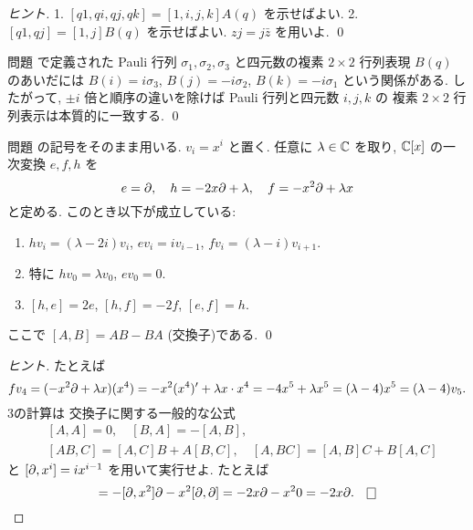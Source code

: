 \documentclass[12pt,twoside]{jarticle}
\begin{document}
\begin{proof}[ヒント]
  1. $[q1,qi,qj,qk]=[1,i,j,k]A(q)$ を示せばよい.
  2. $[q1,qj]=[1,j]B(q)$ を示せばよい. $zj=j\bar{z}$ を用いよ.
  \qed
\end{proof}

\begin{guide}
  問題  で定義された Pauli 行列 $\sigma_1,\sigma_2,\sigma_3$ 
  と四元数の複素 $2\times 2$ 行列表現 $B(q)$ のあいだには %
  $B(i)=i\sigma_3$, $B(j)=-i\sigma_2$, $B(k)=-i\sigma_1$ という関係がある.
  したがって, $\pm i$ 倍と順序の違いを除けば Pauli 行列と四元数 $i,j,k$ の
  複素 $2\times 2$ 行列表示は本質的に一致する.
  \qed
\end{guide}


\begin{question}[15点]
  \label{q:sl2-1}
  問題  の記号をそのまま用いる.
  $v_i = x^i$ と置く.
  任意に $\lambda\in{\mathbb C}$ を取り,
  ${\mathbb C}[x]$ の一次変換 $e,f,h$ を
  \begin{equation*}
    e = \partial, \quad
    h = -2x\partial+\lambda, \quad
    f = -x^2\partial+\lambda x
  \end{equation*}
  と定める. このとき以下が成立している:
  \begin{enumerate}
  \item   $hv_i = (\lambda - 2i)v_i$, 
    \quad $ev_i = i v_{i-1}$, 
    \quad $fv_i = (\lambda - i)v_{i+1}$.
  \item 特に \quad $hv_0=\lambda v_0$, \quad $ev_0=0$.
  \item $[h,e]=2e$, \quad $[h,f]=-2f$, \quad $[e,f]=h$.
  \end{enumerate}
  ここで $[A,B] = AB-BA$ (交換子)である. \qed
\end{question}

\begin{proof}[ヒント]
  たとえば 
  \begin{equation*}
    fv_4 
    = (-x^2\partial+\lambda x)(x^4)
    = -x^2(x^4)' + \lambda x\cdot x^4
    = -4x^5+\lambda x^5 
    = (\lambda - 4)x^5
    = (\lambda - 4)v_5.
  \end{equation*}
  3の計算は
  交換子に関する一般的な公式 
  \begin{align*}
    &
    [A,A]=0, \quad [B,A]=-[A,B],
    \\ &
    [AB,C]=[A,C]B+A[B,C], \quad [A,BC]=[A,B]C+B[A,C]
  \end{align*}
  と $[\partial,x^i]=ix^{i-1}$ を用いて実行せよ. たとえば
  \begin{equation*}
    [\d, -x^2\d] = -[\d,x^2]\d -x^2[\d,\d] = -2x\d -x^2 0 = -2x\d.
    \qed
  \end{equation*}
\end{proof}
\end{document}
